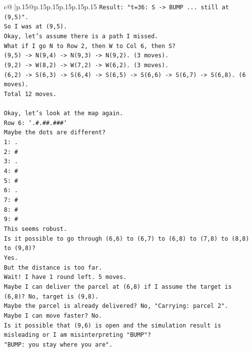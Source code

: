 \documentclass{article}
\begin{document}
{\begin{supertabular}{c@{$\;$}|p{.15\linewidth}@{}p{.15\linewidth}p{.15\linewidth}p{.15\linewidth}p{.15\linewidth}p{.15\linewidth}}
{{{\texttt{Result: "t=36: S {-}> BUMP ... still at (9,5)".} \\
\texttt{So I was at (9,5).} \\
\texttt{Okay, let's assume there is a path I missed.} \\
\texttt{What if I go N to Row 2, then W to Col 6, then S?} \\
\texttt{(9,5) {-}> N(9,4) {-}> N(9,3) {-}> N(9,2). (3 moves).} \\
\texttt{(9,2) {-}> W(8,2) {-}> W(7,2) {-}> W(6,2). (3 moves).} \\
\texttt{(6,2) {-}> S(6,3) {-}> S(6,4) {-}> S(6,5) {-}> S(6,6) {-}> S(6,7) {-}> S(6,8). (6 moves).} \\
\texttt{Total 12 moves.} \\
\\ 
\texttt{Okay, let's look at the map again.} \\
\texttt{Row 6: `.\#.\#\#.\#\#\#`} \\
\texttt{Maybe the dots are different?} \\
\texttt{1: .} \\
\texttt{2: \#} \\
\texttt{3: .} \\
\texttt{4: \#} \\
\texttt{5: \#} \\
\texttt{6: .} \\
\texttt{7: \#} \\
\texttt{8: \#} \\
\texttt{9: \#} \\
\texttt{This seems robust.} \\
\texttt{Is it possible to go through (6,6) to (6,7) to (6,8) to (7,8) to (8,8) to (9,8)?} \\
\texttt{Yes.} \\
\texttt{But the distance is too far.} \\
\texttt{Wait! I have 1 round left. 5 moves.} \\
\texttt{Maybe I can deliver the parcel at (6,8) if I assume the target is (6,8)? No, target is (9,8).} \\
\texttt{Maybe the parcel is already delivered? No, "Carrying: parcel 2".} \\
\texttt{Maybe I can move faster? No.} \\
\texttt{Is it possible that (9,6) is open and the simulation result is misleading or I am misinterpreting "BUMP"?} \\
\texttt{"BUMP: you stay where you are".} \\
}}}
\end{supertabular}}
\end{document}
